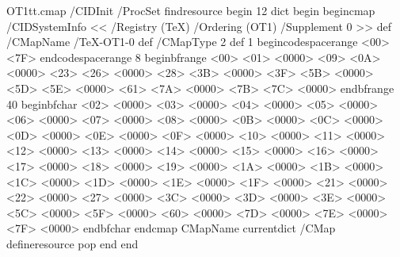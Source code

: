 \newcommand{\cref}[1]{Chapter~ \ref{#1}}
\newcommand{\sref}[1]{Section~ \ref{#1}}
\newcommand{\fref}[1]{Figure~ \ref{#1}}
\newcommand{\tref}[1]{Table~ \ref{#1}}
\newcommand{\lref}[1]{Listing~ \ref{#1}}

\usepackage[resetfonts]{cmap}

\begin{VerbatimOut}{OT1tt.cmap}
/CIDInit /ProcSet findresource begin
12 dict begin
begincmap
/CIDSystemInfo
<< /Registry (TeX)
/Ordering (OT1)
/Supplement 0
>> def
/CMapName /TeX-OT1-0 def
/CMapType 2 def
1 begincodespacerange
<00> <7F>
endcodespacerange
8 beginbfrange
<00> <01> <0000>
<09> <0A> <0000>
<23> <26> <0000>
<28> <3B> <0000>
<3F> <5B> <0000>
<5D> <5E> <0000>
<61> <7A> <0000>
<7B> <7C> <0000>
endbfrange
40 beginbfchar
<02> <0000>
<03> <0000>
<04> <0000>
<05> <0000>
<06> <0000>
<07> <0000>
<08> <0000>
<0B> <0000>
<0C> <0000>
<0D> <0000>
<0E> <0000>
<0F> <0000>
<10> <0000>
<11> <0000>
<12> <0000>
<13> <0000>
<14> <0000>
<15> <0000>
<16> <0000>
<17> <0000>
<18> <0000>
<19> <0000>
<1A> <0000>
<1B> <0000>
<1C> <0000>
<1D> <0000>
<1E> <0000>
<1F> <0000>
<21> <0000>
<22> <0000>
<27> <0000>
<3C> <0000>
<3D> <0000>
<3E> <0000>
<5C> <0000>
<5F> <0000>
<60> <0000>
<7D> <0000>
<7E> <0000>
<7F> <0000>
endbfchar
endcmap
CMapName currentdict /CMap defineresource pop
end
end
\end{VerbatimOut}